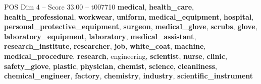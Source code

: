 \begin{textsample}{POS Dim 4 – Score 33.00 – t007710}  \label{ex:f4_pos_002}
\textbf{medical}, \textbf{health\_care}, \textbf{health\_professional}, \textbf{workwear}, \textbf{uniform}, \textbf{medical\_equipment}, \textbf{hospital}, \textbf{personal\_protective\_equipment}, \textbf{surgeon}, \textbf{medical\_glove}, \textbf{scrubs}, \textbf{glove}, \textbf{laboratory\_equipment}, \textbf{laboratory}, \textbf{medical\_assistant}, \textbf{research\_institute}, \textbf{researcher}, \textbf{job}, \textbf{white\_coat}, \textbf{machine}, \textbf{medical\_procedure}, \textbf{research}, engineering, \textbf{scientist}, \textbf{nurse}, \textbf{clinic}, \textbf{safety\_glove}, \textbf{plastic}, \textbf{physician}, \textbf{chemist}, \textbf{science}, \textbf{cleanliness}, \textbf{chemical\_engineer}, \textbf{factory}, \textbf{chemistry}, \textbf{industry}, \textbf{scientific\_instrument}

\end{textsample}
